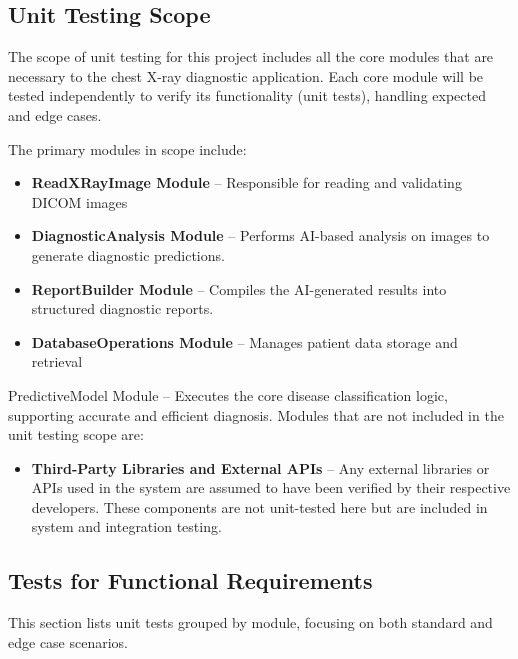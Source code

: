 \documentclass[12pt, titlepage]{article}
\begin{document}
\subsection{Unit Testing Scope}

The scope of unit testing for this project includes all the core modules that are necessary to the chest X-ray diagnostic application. Each core module will be tested independently to verify its functionality (unit tests), handling expected and edge cases.

The primary modules in scope include:
\begin{itemize}
  \item \textbf{ReadXRayImage Module} – Responsible for reading and validating DICOM images
  \item \textbf{DiagnosticAnalysis Module} – Performs AI-based analysis on images to generate diagnostic predictions.
  \item \textbf{ReportBuilder Module} – Compiles the AI-generated results into structured diagnostic reports.
  \item \textbf{DatabaseOperations Module} – Manages patient data storage and retrieval
\end{itemize}

PredictiveModel  Module – Executes the core disease classification logic, supporting accurate and efficient diagnosis.
Modules that are not included in the unit testing scope are:
\begin{itemize}
  \item \textbf{Third-Party Libraries and External APIs} – Any external libraries or APIs used in the system are assumed to have been verified by their respective developers. These components are not unit-tested here but are included in system and integration testing.
\end{itemize}

\subsection{Tests for Functional Requirements}
This section lists unit tests grouped by module, focusing on both standard and edge case scenarios.
\end{document}
